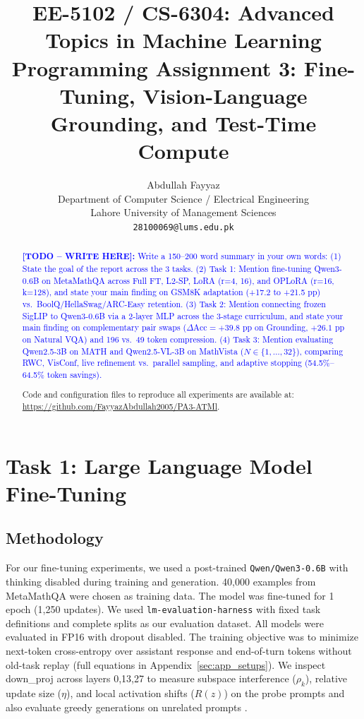\documentclass{article}
\title{EE-5102 / CS-6304: Advanced Topics in Machine Learning\\Programming Assignment 3: Fine-Tuning, Vision-Language Grounding, and Test-Time Compute}
\author{%
  Abdullah Fayyaz \\
  Department of Computer Science / Electrical Engineering \\
  Lahore University of Management Sciences \\
  \texttt{28100069@lums.edu.pk} \\
}
\newcommand{\writetodo}[1]{\noindent\textcolor{blue}{\textbf{[TODO -- WRITE HERE]:} #1}\par\medskip}
\begin{document}
\maketitle

\begin{abstract}
\writetodo{Write a 150--200 word summary in your own words:
(1) State the goal of the report across the 3 tasks.
(2) Task 1: Mention fine-tuning Qwen3-0.6B on MetaMathQA across Full FT, L2-SP, LoRA (r=4, 16), and OPLoRA (r=16, k=128), and state your main finding on GSM8K adaptation (+17.2 to +21.5 pp) vs.\ BoolQ/HellaSwag/ARC-Easy retention.
(3) Task 2: Mention connecting frozen SigLIP to Qwen3-0.6B via a 2-layer MLP across the 3-stage curriculum, and state your main finding on complementary pair swaps ($\Delta\text{Acc} = +39.8$ pp on Grounding, $+26.1$ pp on Natural VQA) and 196 vs.\ 49 token compression.
(4) Task 3: Mention evaluating Qwen2.5-3B on MATH and Qwen2.5-VL-3B on MathVista ($N \in \{1,\dots,32\}$), comparing RWC, VisConf, live refinement vs.\ parallel sampling, and adaptive stopping (54.5\%--64.5\% token savings).}
Code and configuration files to reproduce all experiments are available at: \url{https://github.com/FayyazAbdullah2005/PA3-ATMl}.
\end{abstract}

\section{Task 1: Large Language Model Fine-Tuning}
\label{sec:task1}

\subsection{Methodology}
\label{sec:task1_methodology}
For our fine-tuning experiments, we used a post-trained \texttt{Qwen/Qwen3-0.6B} with thinking disabled during training and generation. 40,000 examples from MetaMathQA were chosen as training data. The model was fine-tuned for 1 epoch (1,250 updates). We used \texttt{lm-evaluation-harness} with fixed task definitions and complete splits as our evaluation dataset. All models were evaluated in FP16 with dropout disabled. The training objective was to minimize next-token cross-entropy over assistant response and end-of-turn tokens without old-task replay (full equations in Appendix~\ref{sec:app_setups}).  We inspect down\_proj across layers 0,13,27  to measure subspace interference ($\rho_k$), relative update size ($\eta$), and local activation shifts ($R(z)$) on  the probe prompts and also evaluate greedy generations on unrelated prompts .
\end{document}
